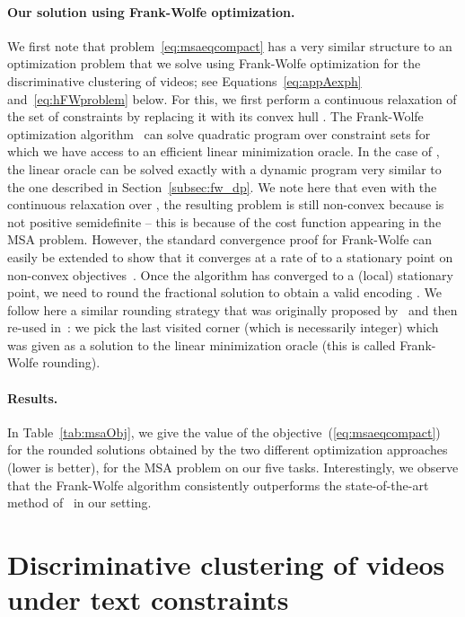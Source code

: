 \documentclass[10pt,twocolumn,letterpaper]{article}
\begin{document}
\paragraph{Our solution using Frank-Wolfe optimization.}
We first note that problem~\eqref{eq:msaeqcompact} has a very similar 
structure to an optimization problem that we solve using Frank-Wolfe optimization 
for the discriminative clustering of videos; see Equations~\eqref{eq:appAexph} and~\eqref{eq:hFWproblem} below.
For this, we first perform a continuous relaxation of the set of constraints  by replacing it with its convex hull .
The Frank-Wolfe optimization algorithm~\cite{Jaggi2013} can solve quadratic program over constraint sets
for which we have access to an efficient linear minimization oracle.
In the case of ,
the linear oracle can be solved exactly with a dynamic program very similar to the one described in Section~\ref{subsec:fw_dp}.
We note here that even with the continuous relaxation over , the resulting problem is still non-convex because  is not positive semidefinite -- this is because of the cost function appearing in the MSA problem.
However, the standard convergence proof for Frank-Wolfe can easily be extended to show
that it converges at a rate of  to a stationary point on non-convex objectives~.
Once the algorithm has converged to a (local) stationary point,
we need to round the fractional solution to obtain a valid encoding .
We follow here a similar rounding strategy that was originally proposed by~
and then re-used in~\cite{Joulin14efficient}: we pick the last visited
corner (which is necessarily integer) 
which was given as a solution to the linear minimization oracle
(this is called Frank-Wolfe rounding). 

\paragraph{Results.} In Table~\ref{tab:msaObj}, we give the value of the objective~(\ref{eq:msaeqcompact}) for the rounded solutions obtained by the two different optimization approaches (lower is better), for the MSA problem on our
five tasks.
Interestingly, we observe that the Frank-Wolfe algorithm consistently outperforms the state-of-the-art method of~\cite{Lee01poa} in our setting.


\section{Discriminative clustering of videos under text constraints }
\label{sec:details_diffrac}
\end{document}
